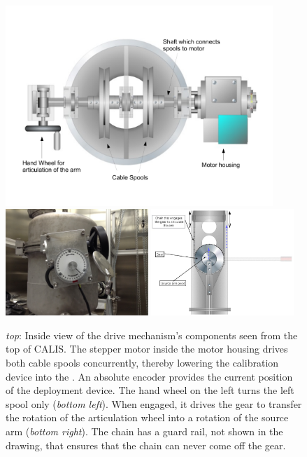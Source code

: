 \begin{figure}[htbp]
 \centering
\includegraphics[width=0.9\textwidth]{Figures/gearDrawing}
  \includegraphics[width=0.48\textwidth]{Figures/ArticulationProtractor_IMG_2667.JPG}
  \includegraphics[width=0.48\textwidth]{Figures/sourceArmArticulation.png}
  \caption{\textit{top}: Inside view of the drive mechanism's components seen from the top of CALIS. The stepper motor inside the motor housing drives both cable spools concurrently, thereby lowering the calibration device into the \lsv. An absolute encoder provides the current position of the deployment device. The hand wheel on the left turns the left spool only (\textit{bottom left}). When engaged, it drives the gear to transfer the rotation of the articulation wheel into a rotation of the source arm (\textit{bottom right}). The chain has a guard rail, not shown in the drawing, that ensures that the chain can never come off the gear.}
  \label{fig:sourceArmRotation}
\end{figure} 

